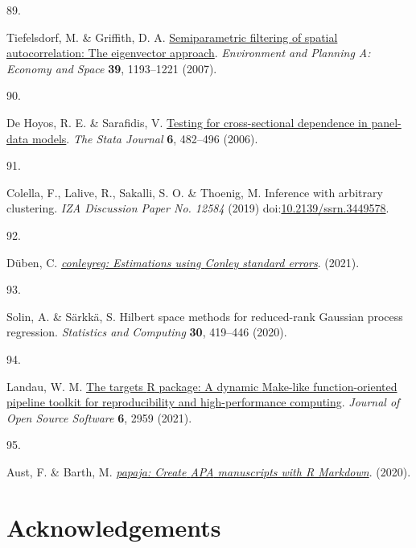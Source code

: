 \documentclass[
  man,floatsintext]{apa6}
\newlength{\cslhangindent}
\newlength{\csllabelwidth}
\newlength{\cslentryspacingunit} %
\newenvironment{CSLReferences}[2] %
 {%
  \setlength{\parindent}{0pt}
  \ifodd #1
  \let\oldpar\par
  \def\par{\hangindent=\cslhangindent\oldpar}
  \fi
  \setlength{\parskip}{#2\cslentryspacingunit}
 }%
 {}
\newcommand{\CSLLeftMargin}[1]{\parbox[t]{\csllabelwidth}{#1}}
\newcommand{\CSLRightInline}[1]{\parbox[t]{\linewidth - \csllabelwidth}{#1}\break}
\begin{document}
\begin{CSLReferences}{0}{0}
\leavevmode{}%
\CSLLeftMargin{89. }%
\CSLRightInline{Tiefelsdorf, M. \& Griffith, D. A. \href{https://doi.org/10.1068/a37378}{Semiparametric filtering of spatial autocorrelation: The eigenvector approach}. \emph{Environment and Planning A: Economy and Space} \textbf{39}, 1193--1221 (2007).}

\leavevmode{}%
\CSLLeftMargin{90. }%
\CSLRightInline{De Hoyos, R. E. \& Sarafidis, V. \href{https://doi.org/10.1177/1536867X0600600403}{Testing for cross-sectional dependence in panel-data models}. \emph{The Stata Journal} \textbf{6}, 482--496 (2006).}

\leavevmode{}%
\CSLLeftMargin{91. }%
\CSLRightInline{Colella, F., Lalive, R., Sakalli, S. O. \& Thoenig, M. Inference with arbitrary clustering. \emph{IZA Discussion Paper No. 12584} (2019) doi:\href{https://doi.org/10.2139/ssrn.3449578}{10.2139/ssrn.3449578}.}

\leavevmode{}%
\CSLLeftMargin{92. }%
\CSLRightInline{Düben, C. \emph{\href{https://CRAN.R-project.org/package=conleyreg}{{conleyreg}: Estimations using {C}onley standard errors}}. (2021).}

\leavevmode{}%
\CSLLeftMargin{93. }%
\CSLRightInline{Solin, A. \& Särkkä, S. Hilbert space methods for reduced-rank {G}aussian process regression. \emph{Statistics and Computing} \textbf{30}, 419--446 (2020).}

\leavevmode{}%
\CSLLeftMargin{94. }%
\CSLRightInline{Landau, W. M. \href{https://doi.org/10.21105/joss.02959}{The targets {R} package: A dynamic {M}ake-like function-oriented pipeline toolkit for reproducibility and high-performance computing}. \emph{Journal of Open Source Software} \textbf{6}, 2959 (2021).}

\leavevmode{}%
\CSLLeftMargin{95. }%
\CSLRightInline{Aust, F. \& Barth, M. \emph{\href{https://github.com/crsh/papaja}{{papaja}: {Create} {APA} manuscripts with {R Markdown}}}. (2020).}

\end{CSLReferences}

\endgroup

\newpage

\hypertarget{acknowledgements}{%
\section{Acknowledgements}\label{acknowledgements}}
\end{document}
